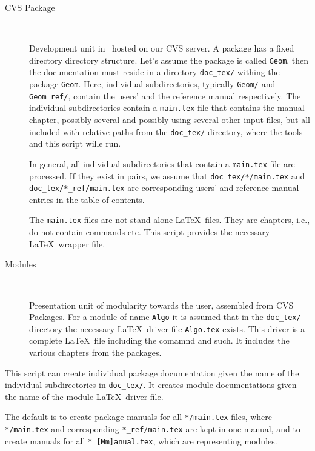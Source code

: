 \begin{description}
  \item[CVS Package]~
 
     Development unit in \cgal\ hosted on our CVS server. A package has a 
     fixed directory directory structure. Let's assume the package is 
     called \texttt{Geom}, then the documentation must reside in a directory
     \texttt{doc\_tex/} withing the package \texttt{Geom}. Here,
     individual subdirectories, typically \texttt{Geom/} and
     \texttt{Geom\_ref/}, contain the users' and the reference 
     manual respectively. The individual subdirectories contain a 
     \texttt{main.tex} file that contains the manual chapter, possibly
     several and possibly using several other input files, but all
     included with relative paths from the \texttt{doc\_tex/}
     directory, where the tools and this script wille run.
     
     In general, all individual subdirectories that contain a 
     \texttt{main.tex} file are processed. If they exist in pairs, we
     assume that \texttt{doc\_tex/*/main.tex} and
     \texttt{doc\_tex/*\_ref/main.tex} are corresponding users' and
     reference manual entries in the table of contents.

     The \texttt{main.tex} files are not stand-alone \LaTeX\ files. They are
     chapters, i.e., do not contain \verb|| commands
     etc. This script provides the necessary \LaTeX\ wrapper file.

   \item[Modules]~
 
     Presentation unit of modularity towards the user, assembled from
     CVS Packages. For a module of name \texttt{Algo} it is assumed
     that in the \texttt{doc\_tex/} directory  the necessary \LaTeX\
     driver file \texttt{Algo.tex} exists.
     This driver is a complete \LaTeX\ file including the
     \verb|| comamnd and such. It includes the various
     chapters from the packages.
\end{description}

 This script can create individual package documentation given the name of
 the individual subdirectories in \texttt{doc\_tex/}. It creates module 
 documentations given the name of the module \LaTeX\ driver file.
 
 The default is to create package manuals for all \texttt{*/main.tex} files,
 where \texttt{*/main.tex} and corresponding \texttt{*\_ref/main.tex}
 are kept in one manual, and to create manuals for all
 \texttt{*\_[Mm]anual.tex}, which are representing modules.
 

